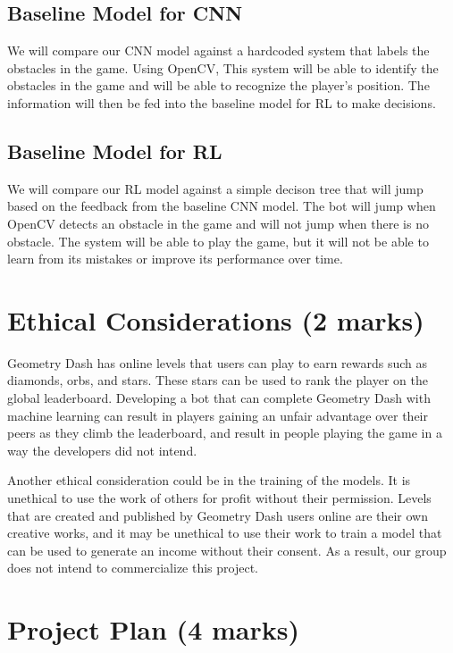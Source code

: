 \documentclass{article} %
\begin{document}
\subsection{Baseline Model for CNN}
We will compare our CNN model against a hardcoded system 
that labels the obstacles in the game. Using OpenCV, This system will
be able to identify the obstacles in the game and will 
be able to recognize the player's position. The information 
will then be fed into the baseline model for RL to make decisions.
\subsection{Baseline Model for RL}
We will compare our RL model against a simple decison tree that
will jump based on the feedback from the baseline CNN model.
The bot will jump when OpenCV detects an obstacle in the
game and will not jump when there is no obstacle. The system will 
be able to play the game, but it will not be able to learn from
its mistakes or improve its performance over time.






\section{Ethical Considerations (2 marks)}
Geometry Dash has online levels that users can play to earn rewards 
such as diamonds, orbs, and stars. These stars can be used to rank 
the player on the global leaderboard. Developing a bot that can complete 
Geometry Dash with machine learning can result in players gaining an 
unfair advantage over their peers as they climb the leaderboard, and 
result in people playing the game in a way the developers did not intend.

Another ethical consideration could be in the training of the models. 
It is unethical to use the work of others for profit without their 
permission. Levels that are created and published by Geometry Dash 
users online are their own creative works, and it may be unethical to 
use their work to train a model that can be used to generate an income 
without their consent. As a result, our group does not intend to 
commercialize this project.


\section{Project Plan (4 marks)}
\end{document}
